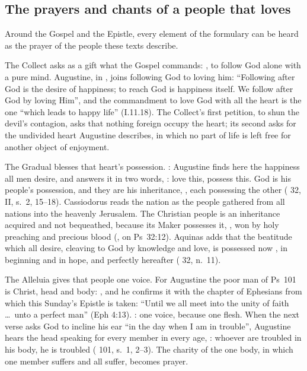 \subsection{The prayers and chants of a people that loves}

Around the Gospel and the Epistle, every element of the formulary can be
heard as the prayer of the people these texts describe.

The Collect asks as a gift what the Gospel commands: , to follow God alone with a pure mind. Augustine, in , joins following God to loving him: ``Following
after God is the desire of happiness; to reach God is happiness itself. We
follow after God by loving Him'', and the commandment to love God with all the
heart is the one ``which leads to happy life'' (I.11.18). The Collect's first
petition, to shun the devil's contagion, asks that nothing foreign occupy the
heart; its second asks for the undivided heart Augustine describes, in which
no part of life is left free for another object of enjoyment.

The Gradual blesses that heart's possession. : Augustine finds here the happiness all men desire, and
answers it in two words, : love this, possess
this. God is his people's possession, and they are his inheritance,
, each possessing the other
( 32, II, s.~2, 15--18). Cassiodorus reads the
nation as the people gathered from all nations into the heavenly Jerusalem.
The Christian people is an inheritance acquired and not bequeathed, because its
Maker possesses it, , won by holy preaching and precious blood (, on Ps~32:12). Aquinas adds that the beatitude which all desire,
cleaving to God by knowledge and love, is possessed now , in beginning and in hope, and perfectly hereafter (
32, n.~11).

The Alleluia gives that people one voice. For Augustine the poor man of Ps~101
is Christ, head and body: , and he confirms it with the chapter of Ephesians from
which this Sunday's Epistle is taken: ``Until we all meet into the unity of
faith \dots\ unto a perfect man'' (Eph 4:13). : one voice, because one flesh. When the next verse asks God to incline his
ear ``in the day when I am in trouble'', Augustine hears the head speaking for
every member in every age, : whoever are troubled in his body, he is troubled
( 101, s.~1, 2--3). The charity of the one body,
in which one member suffers and all suffer, becomes prayer.

